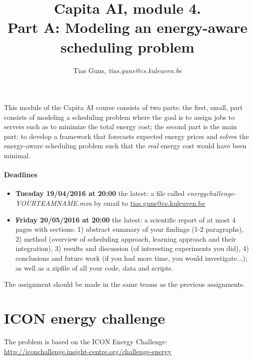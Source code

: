 \documentclass[a4,12pt]{article}
\title{Capita AI, module 4.\\Part A: Modeling an energy-aware scheduling problem}
\author{Tias Guns, \textit{tias.guns@cs.kuleuven.be}}
\begin{document}
\maketitle

This module of the Capita AI course consists of two parts: the first, small, part consists of modeling a scheduling problem where the goal is to assign jobs to servers such as to minimize the total energy cost; the second part is the main part: to develop a framework that forecasts expected energy prices and solves the energy-aware scheduling problem such that the \textit{real} energy cost would have been minimal.

\paragraph{Deadlines}
\begin{itemize}
\item \textbf{Tuesday 19/04/2016 at 20:00} the latest: a file called \textit{energychallenge-YOURTEAMNAME.mzn} by email to \url{tias.guns@cs.kuleuven.be}
\item \textbf{Friday 20/05/2016 at 20:00} the latest: a scientific report of at most 4 pages with sections: 1) abstract summary of your findings (1-2 paragraphs), 2) method (overview of scheduling approach, learning approach and their integration), 3) results and discussion (of interesting experiments you did), 4) conclusions and future work (if you had more time, you would investigate...); as well as a zipfile of all your code, data and scripts.
\end{itemize}

The assignment should be made in the same teams as the previous assignments.


\section{ICON energy challenge}
The problem is based on the ICON Energy Challenge:\\
\url{http://iconchallenge.insight-centre.org/challenge-energy}
\end{document}

